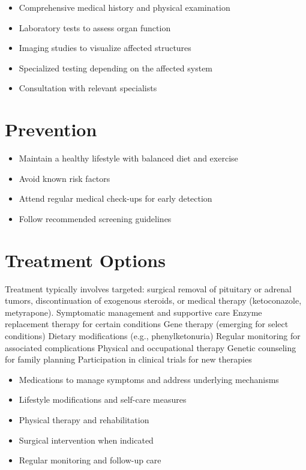 \begin{itemize}[noitemsep]
  \item Comprehensive medical history and physical examination
  \item Laboratory tests to assess organ function
  \item Imaging studies to visualize affected structures
  \item Specialized testing depending on the affected system
  \item Consultation with relevant specialists
\end{itemize}
\section{Prevention}
\begin{itemize}[noitemsep]
  \item Maintain a healthy lifestyle with balanced diet and exercise
  \item Avoid known risk factors
  \item Attend regular medical check-ups for early detection
  \item Follow recommended screening guidelines
\end{itemize}
\section{Treatment Options}
Treatment typically involves targeted: surgical removal of pituitary or adrenal tumors, discontinuation of exogenous steroids, or medical therapy (ketoconazole, metyrapone). Symptomatic management and supportive care Enzyme replacement therapy for certain conditions Gene therapy (emerging for select conditions) Dietary modifications (e.g., phenylketonuria) Regular monitoring for associated complications Physical and occupational therapy Genetic counseling for family planning Participation in clinical trials for new therapies

\begin{itemize}[noitemsep]
  \item Medications to manage symptoms and address underlying mechanisms
  \item Lifestyle modifications and self-care measures
  \item Physical therapy and rehabilitation
  \item Surgical intervention when indicated
  \item Regular monitoring and follow-up care
\end{itemize}
